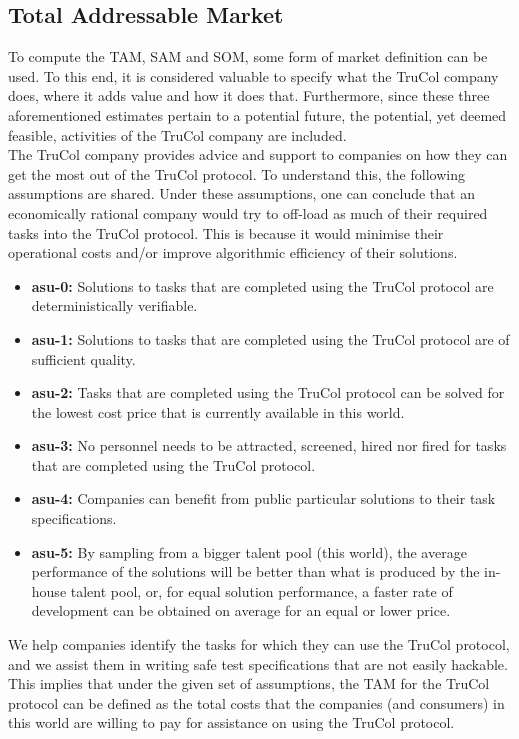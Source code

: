 \subsection{Total Addressable Market}\label{subsec:total_addressable_market}
To compute the TAM, SAM and SOM, some form of market definition can be used. To this end, it is considered valuable to specify what the TruCol company does, where it adds value and how it does that. Furthermore, since these three aforementioned estimates pertain to a potential future, the potential, yet deemed feasible, activities of the TruCol company are included.
\\
The TruCol company provides advice and support to companies on how they can get the most out of the TruCol protocol. To understand this, the following assumptions are shared. Under these assumptions, one can conclude that an economically rational company would try to off-load as much of their required tasks into the TruCol protocol. This is because it would minimise their operational costs and/or improve algorithmic efficiency of their solutions.

\begin{itemize}
	\item \textbf{asu-0:} Solutions to tasks that are completed using the TruCol protocol are deterministically verifiable.
	\item \textbf{asu-1:} Solutions to tasks that are completed using the TruCol protocol are of sufficient quality.
	\item \textbf{asu-2:} Tasks that are completed using the TruCol protocol can be solved for the lowest cost price that is currently available in this world.
	\item \textbf{asu-3:} No personnel needs to be attracted, screened, hired nor fired for tasks that are completed using the TruCol protocol.
	\item \textbf{asu-4:} Companies can benefit from public particular solutions to their task specifications.
	\item \textbf{asu-5:} By sampling from a bigger talent pool (this world), the average performance of the solutions will be better than what is produced by the in-house talent pool, or, for equal solution performance, a faster rate of development can be obtained on average for an equal or lower price.
\end{itemize}



We help companies identify the tasks for which they can use the TruCol protocol, and we assist them in writing safe test specifications that are not easily hackable. This implies that under the given set of assumptions, the TAM for the TruCol protocol can be defined as the total costs that the companies (and consumers) in this world are willing to pay for assistance on using the TruCol protocol.

